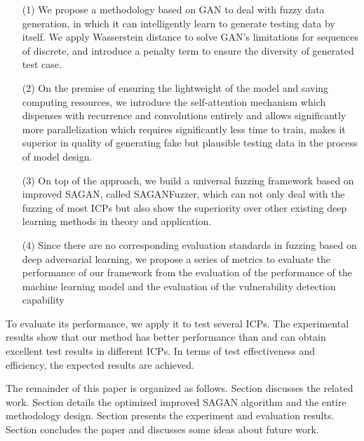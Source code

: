 \begin{itemize}
\item[(1)] We propose a methodology based on GAN to deal with fuzzy data generation, in which it can intelligently learn to generate testing data by itself. We apply Wasserstein distance\cite{arjovsky2017wasserstein}  to solve GAN's limitations for sequences of discrete, and introduce a penalty term to ensure the diversity of generated test case.
\item[(2)] On the premise of ensuring the lightweight of the model and saving computing resources, we introduce the self-attention mechanism which dispenses with recurrence and convolutions entirely and allows significantly more parallelization which requires significantly less time to train, makes it superior in quality of generating fake but plausible testing data in the process of model design.
\item[(3)] On top of the approach, we build a universal fuzzing framework based on improved SAGAN, called SAGANFuzzer, which can not only deal with the fuzzing of most ICPs but also show the superiority over other existing deep learning methods in theory and application. %
\item[(4)] Since there are no corresponding evaluation standards in fuzzing based on deep adversarial learning, we propose a series of metrics to evaluate the performance of our framework from the evaluation of the performance of the machine learning model and the evaluation of the vulnerability detection capability
\end{itemize}

To evaluate its performance, we apply it to test several ICPs. The experimental results show that our method has better performance than and can obtain excellent test results in different ICPs. In terms of test effectiveness and efficiency, the expected results are achieved.

The remainder of this paper is organized as follows. Section \uppercase\expandafter{} discusses the related work. Section \uppercase\expandafter{} details the optimized improved SAGAN algorithm and the entire methodology design. Section \uppercase\expandafter{} presents the experiment and evaluation results. Section \uppercase\expandafter{} concludes the paper and discusses some ideas about future work.
